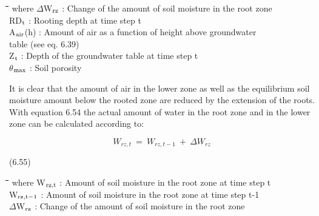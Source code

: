 \documentclass[11pt]{article}
\begin{document}
\bigskip
\nwln
\begin{tabbing}
\hspace{1.27cm}\=\hspace{1.27cm}\=\hspace{1.27cm}\=\hspace{1.27cm}\=%
\hspace{1.27cm}\=\hspace{1.27cm}\=\hspace{1.27cm}\=\hspace{1.27cm}\=%
\hspace{1.27cm}\=\hspace{1.27cm}\=\kill
where\> $\Delta$W$_{{\rm rz}}$\> : Change of the amount of soil moisture in the root zone\> \> \> \> \> \> \> \> [cm]\\
\>RD$_{{\rm t}}$\> : Rooting depth at time step t\> \> \> \> \> \> \> \> [cm]\\
\>A$_{{\rm air}}$(h)\> : Amount of air as a function of height above groundwater \\
\>\>   table\>  (see eq. 6.39)\> \> \> \> \> \> \> [cm]\\
\>Z$_{{\rm t}}$\> : Depth of the groundwater table at time step t\> \> \> \> \> \> \> \> [cm]\\
\>$\theta$$_{{\rm max}}$\> : Soil porosity\> \> \> \> \> \> \> \> [cm$^{{\rm 3}}$ cm$^{{\rm -3}}$]
\end{tabbing}

\bigskip
\bigskip
\bigskip
It is clear that the amount of air in the lower zone as well as the equilibrium soil moisture
amount below the rooted zone are reduced by the extension of the roots. With equation
6.54 the actual amount of water in the root zone and in the lower zone can be calculated
according to:

\begin{displaymath}
 W _{rz,t} ~=~ W _{rz, t-1} ~+~ \Delta W _{rz} 
\end{displaymath}

 \bigskip
\strut\hfill (6.55)
\nwln
\begin{tabbing}
\hspace{1.27cm}\=\hspace{1.27cm}\=\hspace{1.27cm}\=\hspace{1.27cm}\=%
\hspace{1.27cm}\=\hspace{1.27cm}\=\hspace{1.27cm}\=\hspace{1.27cm}\=%
\hspace{1.27cm}\=\hspace{1.27cm}\=\kill
where\> W$_{{\rm rz,t}}$\> : Amount of soil moisture in the root zone at time step t\> \> \> \> \> \> \> \> [cm]\\
\>W$_{{\rm rz,t-1}}$\> : Amount of soil moisture in the root zone at time step t-1\> \> \> \> \> \> \> \> [cm]\\
\>$\Delta$W$_{{\rm rz}}$\> : Change of the amount of soil moisture in the root zone\> \> \> \> \> \> \> \> [cm]
\end{tabbing}
\end{document}

